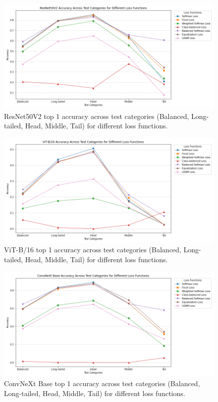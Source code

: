 \begin{figure}[h!]
    \centering
    \includegraphics[width=\textwidth]{Images/Plots/resnet_lt_loss_comparison_line.png}
    \caption{ResNet50V2 top 1 accuracy across test categories (Balanced, Long-tailed, Head, Middle, Tail) for different loss functions.}
    \label{fig:resnet_bal_loss_comparison_line}
\end{figure}

\begin{figure}[h!]
    \centering
    \includegraphics[width=\textwidth]{Images/Plots/vit_lt_loss_comparison_line.png}
    \caption{ViT-B/16 top 1 accuracy across test categories (Balanced, Long-tailed, Head, Middle, Tail) for different loss functions.}
    \label{fig:vit_bal_loss_comparison_line}
\end{figure}

\begin{figure}[h!]
    \centering
    \includegraphics[width=\textwidth]{Images/Plots/convnext_lt_loss_comparison_line.png}
    \caption{ConvNeXt Base top 1 accuracy across test categories (Balanced, Long-tailed, Head, Middle, Tail) for different loss functions.}
    \label{fig:conv_bal_loss_comparison_line}
\end{figure}


